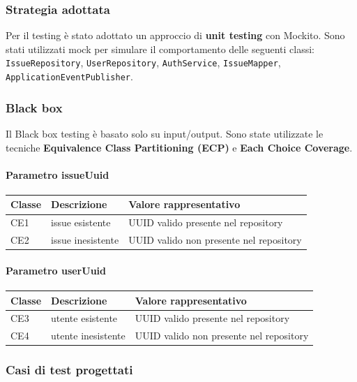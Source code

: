 \documentclass[a4paper,12pt]{article}
\begin{document}
\subsubsection{Strategia adottata}
Per il testing è stato adottato un approccio di \textbf{unit testing} con Mockito. Sono stati utilizzati mock per simulare il comportamento delle seguenti classi: \texttt{IssueRepository}, \texttt{UserRepository}, \texttt{AuthService}, \texttt{IssueMapper}, \texttt{ApplicationEventPublisher}.

\subsubsection{Black box}
Il Black box testing è basato solo su input/output. Sono state utilizzate le tecniche \textbf{Equivalence Class Partitioning (ECP)} e \textbf{Each Choice Coverage}.

\paragraph{Parametro issueUuid}
\begin{longtable}{|p{1.8cm}|p{5.3cm}|p{6.2cm}|}
\hline
\textbf{Classe} & \textbf{Descrizione} & \textbf{Valore rappresentativo} \\ \hline
CE1 & issue esistente & UUID valido presente nel repository \\ \hline
CE2 & issue inesistente & UUID valido non presente nel repository \\ \hline
\end{longtable}

\paragraph{Parametro userUuid}
\begin{longtable}{|p{1.8cm}|p{5.3cm}|p{6.2cm}|}
\hline
\textbf{Classe} & \textbf{Descrizione} & \textbf{Valore rappresentativo} \\ \hline
CE3 & utente esistente & UUID valido presente nel repository \\ \hline
CE4 & utente inesistente & UUID valido non presente nel repository \\ \hline
\end{longtable}

\subsubsection{Casi di test progettati}
\end{document}
